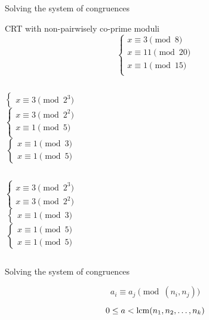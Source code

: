 \begin{frame}{Solving the system of congruences}
  \begin{exampleblock}{CRT with non-pairwisely co-prime moduli}
	\[
	  \begin{cases}
		x \equiv 3 \pmod{8} \\
		x \equiv 11 \pmod{20} \\
		x \equiv 1 \pmod{15} \\
	  \end{cases}
	\]
  \end{exampleblock}

  \begin{columns}
	  \pause
	  \[
		\begin{cases}
		  x \equiv 3 \pmod{2^3}
		\end{cases}
	  \]
	  \pause
	  \[
		\begin{cases}
		  x \equiv 3 \pmod{2^2} \\
		  x \equiv 1 \pmod{5} \\
		\end{cases}
	  \]
	  \pause
	  \[
		\begin{cases}
		  x \equiv 1 \pmod{3} \\
		  x \equiv 1 \pmod{5}
		\end{cases}
	  \]
  \end{columns}

  \begin{columns}
	  \pause
	  \[
		\begin{cases}
		  x \equiv 3 \pmod{2^3} \\
		  x \equiv 3 \pmod{2^2}
		\end{cases}
	  \]
	  \pause
	  \[
		\begin{cases}
		  x \equiv 1 \pmod{3}
		\end{cases}
	  \]
	  \pause
	  \[
		\begin{cases}
		  x \equiv 1 \pmod{5} \\
		  x \equiv 1 \pmod{5}
		\end{cases}
	  \]
  \end{columns}
\end{frame}
\begin{frame}{Solving the system of congruences}
  \begin{theorem}
	\[
	  a_i \equiv a_j \pmod{(n_i, n_j)}
	\]

	\[
	  0 \le a < \operatorname{lcm}(n_1, n_2, \ldots, n_k)
	\]
  \end{theorem}
\end{frame}
\begin{frame}[noframenumbering]
\end{frame}
